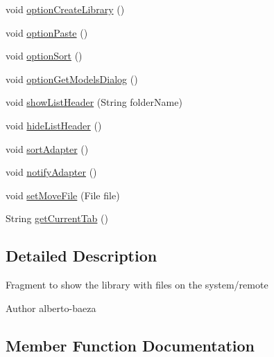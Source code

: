 \begin{DoxyCompactItemize}
\item 
void \hyperlink{classandroid_1_1app_1_1printerapp_1_1library_1_1_library_fragment_a42c4c0e3eef0740c8829f9c21edd00c0}{option\+Create\+Library} ()
\item 
void \hyperlink{classandroid_1_1app_1_1printerapp_1_1library_1_1_library_fragment_a7b62164bf0a322b09c25faca77da9e4a}{option\+Paste} ()
\item 
void \hyperlink{classandroid_1_1app_1_1printerapp_1_1library_1_1_library_fragment_aa49256a888a59633003683c41d8560f2}{option\+Sort} ()
\item 
void \hyperlink{classandroid_1_1app_1_1printerapp_1_1library_1_1_library_fragment_a8b470af037ce601061f8bc445d0a0715}{option\+Get\+Models\+Dialog} ()
\item 
void \hyperlink{classandroid_1_1app_1_1printerapp_1_1library_1_1_library_fragment_a25e7bacb32c542291a2e760b4a016bfb}{show\+List\+Header} (String folder\+Name)
\item 
void \hyperlink{classandroid_1_1app_1_1printerapp_1_1library_1_1_library_fragment_a86fffd3f61197d1af3f6a300132f2c78}{hide\+List\+Header} ()
\item 
void \hyperlink{classandroid_1_1app_1_1printerapp_1_1library_1_1_library_fragment_a54039431175881c72228050a4f649957}{sort\+Adapter} ()
\item 
void \hyperlink{classandroid_1_1app_1_1printerapp_1_1library_1_1_library_fragment_ab87c84c317c07a2009872b29d1906aef}{notify\+Adapter} ()
\item 
void \hyperlink{classandroid_1_1app_1_1printerapp_1_1library_1_1_library_fragment_aa6bdc63b6a3fdcfb1968bd7f7b638356}{set\+Move\+File} (File file)
\item 
String \hyperlink{classandroid_1_1app_1_1printerapp_1_1library_1_1_library_fragment_abe1decae6f318c738e4550fd04622797}{get\+Current\+Tab} ()
\end{DoxyCompactItemize}


\subsection{Detailed Description}
Fragment to show the library with files on the system/remote

\begin{DoxyAuthor}{Author}
alberto-\/baeza 
\end{DoxyAuthor}


\subsection{Member Function Documentation}
\mbox{\label{classandroid_1_1app_1_1printerapp_1_1library_1_1_library_fragment_abe1decae6f318c738e4550fd04622797}} 
